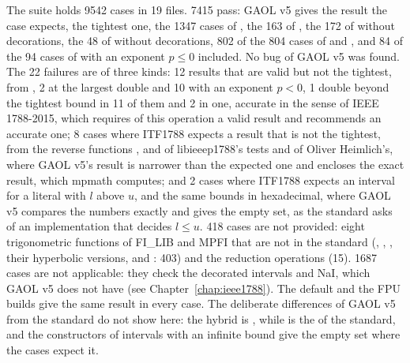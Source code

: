 \documentclass[12pt,a4paper,twoside,openright]{book}
\begin{document}
\medskip
The suite holds 9542 cases in 19 files. 7415 pass: GAOL v5 gives the result
the case expects, the tightest one, the 1347 cases of , the 163
of , the 172 of  without decorations, the 48
of  without decorations, 802 of the 804 cases of
 and , and 84 of the 94 cases of 
with an exponent $p \leq 0$ included. No bug of GAOL v5 was found. The 22
failures are of three kinds: 12 results that are valid but not the
tightest, from , 2 at the largest double and 10 with an
exponent $p < 0$, 1 double beyond the tightest bound in 11 of them and 2 in
one, accurate in the sense of IEEE 1788-2015, which requires of this
operation a valid result and recommends an accurate one; 8 cases where
ITF1788 expects a result that is not the tightest, from the reverse
functions ,  and  of libieeep1788's
tests and  of Oliver Heimlich's, where GAOL v5's result is
narrower than the expected one and encloses the exact result, which mpmath
computes; and 2 cases where ITF1788 expects an interval for a literal
\code{[l, u]} with $l$ above $u$, \code{[1.0000000000000002,1.0000000000000001]}
and the same bounds in hexadecimal, where GAOL v5 compares the numbers
exactly and gives the empty set, as the standard asks of an implementation
that decides $l \leq u$. 418 cases are not provided: eight trigonometric
functions of FI\_LIB and MPFI that are not in the standard (,
, , their hyperbolic versions,  and
: 403) and the reduction operations (15). 1687 cases are not
applicable: they check the decorated intervals and NaI, which GAOL v5 does
not have (see Chapter~\ref{chap:ieee1788}). The default and the FPU builds give the
same result in every case. The deliberate differences of GAOL v5 from the
standard do not show here: the hybrid  is , while
 is the  of the standard, and the
constructors of intervals with an infinite bound give the empty set where
the cases expect it.
\end{document}
